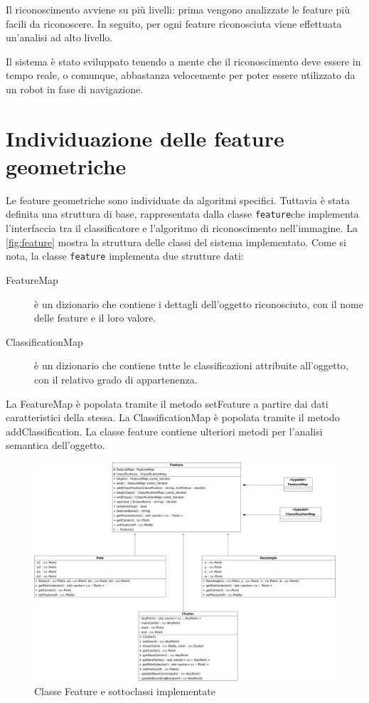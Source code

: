 Il riconoscimento avviene su più livelli: prima vengono analizzate le feature più facili da riconoscere. In seguito, per ogni feature riconosciuta viene effettuata un'analisi ad alto livello.

Il sistema è stato sviluppato tenendo a mente che il riconoscimento deve essere in tempo reale, o comunque, abbastanza velocemente per poter essere utilizzato da un robot in fase di navigazione.

\section{Individuazione delle feature geometriche}

Le feature geometriche sono individuate da algoritmi specifici. Tuttavia è stata definita una struttura di base, rappresentata dalla classe \verb|feature|che implementa l'interfaccia tra il classificatore e l'algoritmo di riconoscimento nell'immagine.
La \autoref{fig:feature} mostra la struttura delle classi del sistema implementato. Come si nota, la classe \verb|feature| implementa due strutture dati:

\begin{description}
 \item [FeatureMap] è un dizionario che contiene i dettagli dell'oggetto riconosciuto, con il nome delle feature e il loro valore.
 \item [ClassificationMap] è un dizionario che contiene tutte le classificazioni attribuite all'oggetto, con il relativo grado di appartenenza.
\end{description}

La FeatureMap è popolata tramite il metodo setFeature a partire dai dati caratteristici della stessa.
La ClassificationMap è popolata tramite il metodo addClassification. La classe feature contiene ulteriori metodi per l'analisi semantica dell'oggetto.

\begin{figure}[ht]
  \includegraphics[width=\textwidth]{diagrammi/Feature}
  \caption{Classe Feature e sottoclassi implementate}
  \label{fig:feature}
\end{figure}

